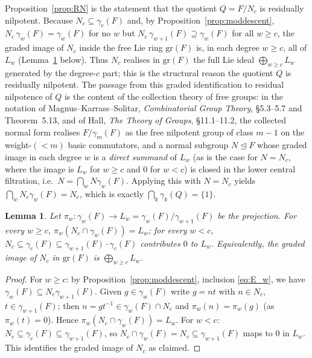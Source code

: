 \documentclass{amsart}
\newtheorem{lemma}{Lemma}
\theoremstyle{definition}
\theoremstyle{remark}
\begin{document}
Proposition~\ref{prop:RN} is the statement that the quotient $Q=F/N_c$ is
residually nilpotent. Because $N_c\subseteq\gamma_c(F)$ and, by
Proposition~\ref{prop:moddescent}, $N_c\,\gamma_w(F)=\gamma_w(F)$ for no $w$ but
$N_c\,\gamma_{w+1}(F)\supseteq\gamma_w(F)$ for all $w\ge c$, the graded image of
$N_c$ inside the free Lie ring $\mathrm{gr}(F)$ is, in each degree $w\ge c$, all of
$L_w$ (Lemma~\ref{lem:gradedNc} below). Thus $N_c$ realises in $\mathrm{gr}(F)$ the
full Lie ideal $\bigoplus_{w\ge c}L_w$ generated by the degree-$c$ part; this is
the structural reason the quotient $Q$ is residually nilpotent. The passage from
this graded identification to residual nilpotence of $Q$ is the content of the
collection theory of free groups: in the notation of Magnus--Karrass--Solitar,
\emph{Combinatorial Group Theory}, \S5.3--5.7 and Theorem~5.13, and of Hall,
\emph{The Theory of Groups}, \S11.1--11.2, the collected normal form realises
$F/\gamma_m(F)$ as the free nilpotent group of class $m-1$ on the weight-$(<m)$
basic commutators, and a normal subgroup $N\trianglelefteq F$ whose graded image
in each degree $w$ is a \emph{direct summand} of $L_w$ (as is the case for
$N=N_c$, where the image is $L_w$ for $w\ge c$ and $0$ for $w<c$) is closed in the
lower central filtration, i.e.\ $N=\bigcap_w N\gamma_w(F)$. Applying this with
$N=N_c$ yields $\bigcap_w N_c\gamma_w(F)=N_c$, which is exactly
$\bigcap_k\gamma_k(Q)=\{1\}$.

\begin{lemma}\label{lem:gradedNc}
Let $\pi_w\colon\gamma_w(F)\to L_w=\gamma_w(F)/\gamma_{w+1}(F)$ be the projection.
For every $w\ge c$, $\pi_w(N_c\cap\gamma_w(F))=L_w$; for every $w<c$,
$N_c\subseteq\gamma_c(F)\subseteq\gamma_{w+1}(F)\cdot\gamma_c(F)$ contributes $0$
to $L_w$. Equivalently, the graded image of $N_c$ in $\mathrm{gr}(F)$ is
$\bigoplus_{w\ge c}L_w$.
\end{lemma}

\begin{proof}
For $w\ge c$: by Proposition~\ref{prop:moddescent}, inclusion \eqref{eq:E_w}, we
have $\gamma_w(F)\subseteq N_c\gamma_{w+1}(F)$. Given $g\in\gamma_w(F)$ write
$g=n t$ with $n\in N_c$, $t\in\gamma_{w+1}(F)$; then $n=g t^{-1}\in
\gamma_w(F)\cap N_c$ and $\pi_w(n)=\pi_w(g)$ (as $\pi_w(t)=0$). Hence
$\pi_w(N_c\cap\gamma_w(F))=L_w$. For $w<c$: $N_c\subseteq\gamma_c(F)\subseteq
\gamma_{w+1}(F)$, so $N_c\cap\gamma_w(F)=N_c\subseteq\gamma_{w+1}(F)$ maps to $0$
in $L_w$. This identifies the graded image of $N_c$ as claimed.
\end{proof}
\end{document}
